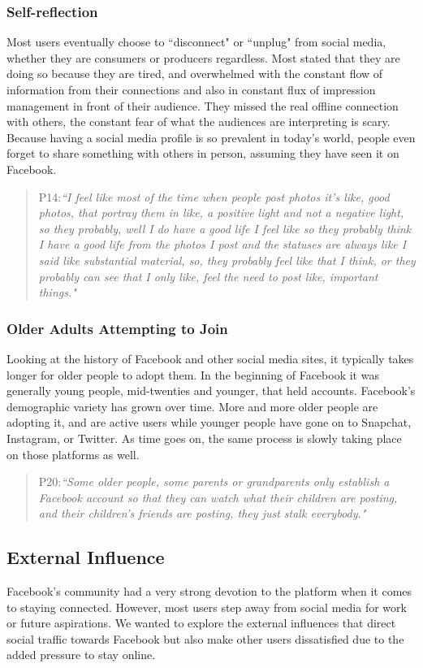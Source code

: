 \subsubsection{Self-reflection}
Most users eventually choose to ``disconnect" or ``unplug" from social media, whether they are consumers or producers regardless. Most stated that they are doing so because they are tired, and overwhelmed with the constant flow of information from their connections and also in constant flux of impression management in front of their audience. They missed the real offline connection with others, the constant fear of what the audiences are interpreting is scary. Because having a social media profile is so prevalent in today's world, people even forget to share something with others in person, assuming they have seen it on Facebook. 
\begin{quote}
P14:\textit{``I feel like most of the time when people post photos it's like, good photos, that portray them in like, a positive light and not a negative light, so they probably, well I do have a good life I feel like so they probably think I have a good life from the photos I post and the statuses are always like I said like substantial material, so, they probably feel like that I think, or they probably can see that I only like, feel the need to post like, important things."}
\end{quote} 

\subsubsection{Older Adults Attempting to Join}
Looking at the history of Facebook and other social media sites, it typically takes longer for older people to adopt them. In the beginning of Facebook it was generally young people, mid-twenties and younger, that held accounts. Facebook's demographic variety has grown over time. More and more older people are adopting it, and are active users while younger people have gone on to Snapchat, Instagram, or Twitter. As time goes on, the same process is slowly taking place on those platforms as well. 
\begin{quote}
P20:\textit{``Some older people, some parents or grandparents only establish a Facebook account so that they can watch what their children are posting, and their children's friends are posting, they just stalk everybody."}
\end{quote}

\subsection{External Influence}
Facebook's community had a very strong devotion to the platform when it comes to staying connected. However, most users step away from social media for work or future aspirations. We wanted to explore the external influences that direct social traffic towards Facebook but also make other users dissatisfied due to the added pressure to stay online.

